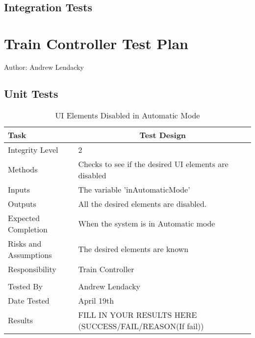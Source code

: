 \documentclass[]{article}
\begin{document}
\subsection{Integration Tests}

\section{Train Controller Test Plan}
Author: Andrew Lendacky
\subsection{Unit Tests}

\begin{table}[H]
	\centering
	\caption{UI Elements Disabled in Automatic Mode}
	\begin{tabular}{|l|l|}
		\hline
		Task & \multicolumn{1}{c|}{Test Design} \\ \hline
		Integrity Level & 2 \\ \hline
		Methods & Checks to see if the desired UI elements are disabled\\ \hline
		Inputs & The variable 'inAutomaticMode'\\ \hline
		Outputs & All the desired elements are disabled. \\ \hline
		Expected Completion & When the system is in Automatic mode\\ \hline
		Risks and Assumptions & The desired elements are known\\ \hline
		Responsibility & Train Controller\\ \hline
			\\ \hline
		Tested By   &  Andrew Lendacky\\	\hline
		Date Tested & \parbox[t]{10cm}{April 19th}\\ \hline
		Results & FILL IN YOUR RESULTS HERE (SUCCESS/FAIL/REASON(If fail))\\ \hline
	\end{tabular}
\end{table}
\end{document}
